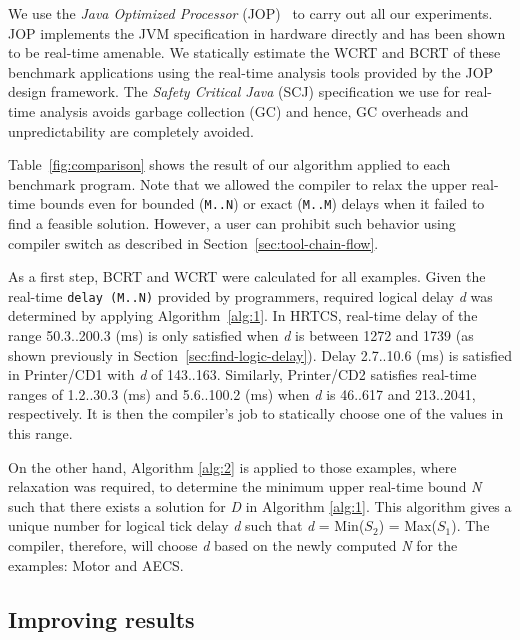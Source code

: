 We use the \textit{Java Optimized Processor}
(JOP)~\cite{jop:jnl:jsa2007} to carry out all our experiments. JOP
implements the JVM specification in hardware directly and has been shown
to be real-time amenable. We statically estimate the WCRT and BCRT of
these benchmark applications using the real-time analysis tools provided
by the JOP design framework. The \textit{Safety Critical Java} (SCJ)
specification we use for real-time analysis avoids garbage collection
(GC) and hence, GC overheads and unpredictability are completely
avoided.


Table~\ref{fig:comparison} shows the result of our algorithm applied to
each benchmark program. Note that we allowed the compiler to relax the
upper real-time bounds even for bounded (\texttt{M..N}) or exact
(\texttt{M..M}) delays when it failed to find a feasible solution.
However, a user can prohibit such behavior using compiler switch as
described in Section~\ref{sec:tool-chain-flow}.

As a first step, BCRT and WCRT were calculated for all examples. Given
the real-time \mbox{\texttt{delay (M..N)}} provided by programmers,
required logical delay \textit{d} was determined by applying
Algorithm~\ref{alg:1}. In HRTCS, real-time delay of the range
50.3..200.3 (ms) is only satisfied when \emph{d} is between 1272 and
1739 (as shown previously in Section~\ref{sec:find-logic-delay}). Delay
2.7..10.6 (ms) is satisfied in Printer/CD1 with \emph{d} of 143..163.
Similarly, Printer/CD2 satisfies real-time ranges of 1.2..30.3 (ms) and
5.6..100.2 (ms) when \emph{d} is 46..617 and 213..2041, respectively. It
is then the compiler's job to statically choose one of the values in
this range.

On the other hand, Algorithm \ref{alg:2} is applied to those examples,
where relaxation was required, to determine the minimum upper real-time
bound \emph{N} such that there exists a solution for \emph{D} in
Algorithm \ref{alg:1}. This algorithm gives a unique number for logical
tick delay \emph{d} such that \emph{d} = Min(\emph{$S_2$}) =
Max(\emph{$S_1$}). The compiler, therefore, will choose \emph{d} based
on the newly computed \emph{N} for the examples: Motor and AECS.

\subsection{Improving results}

